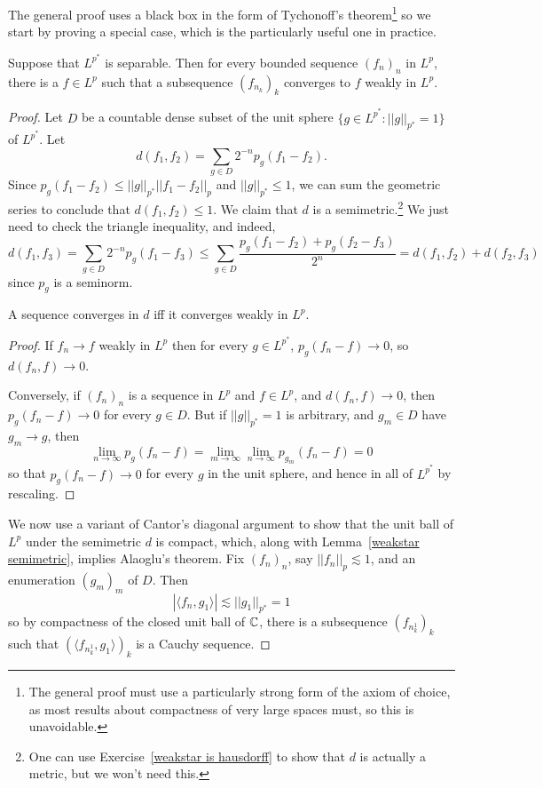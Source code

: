 The general proof uses a black box in the form of Tychonoff's theorem\footnote{The general proof must use a particularly strong form of the axiom of choice, as most results about compactness of very large spaces must, so this is unavoidable.} so we start by proving a special case, which is the particularly useful one in practice.

\begin{theorem}
Suppose that $L^{p^*}$ is separable. Then for every bounded sequence $(f_{n})_{n}$ in $L^p$, there is a $f \in L^p$ such that a subsequence $(f_{n_{k}})_{k}$ converges to $f$ weakly in $L^p$.
\end{theorem}
\begin{proof}
Let $D$ be a countable dense subset of the unit sphere $\{g \in L^{p^*}: ||g||_{p^*} = 1\}$ of $L^{p^*}$.
Let
\[d(f_1, f_2) = \sum_{g \in D} 2^{-n} p_g(f_1 - f_2).\]
Since $p_g(f_1 - f_2) \leq ||g||_{p^*} ||f_1 - f_2||_{p} $ and $||g||_{p^*} \leq 1$, we can sum the geometric series to conclude that $d(f_1, f_2) \leq 1$.
We claim that $d$ is a semimetric.\footnote{One can use Exercise~\ref{weakstar is hausdorff} to show that $d$ is actually a metric, but we won't need this.}
We just need to check the triangle inequality, and indeed,
\[d(f_1, f_3) = \sum_{g \in D} 2^{-n} p_g(f_1 - f_3) \leq \sum_{g \in D} \frac{p_g(f_1 - f_2) + p_g(f_2 - f_3)}{2^n} = d(f_1, f_2) + d(f_2, f_3)\]
since $p_g$ is a seminorm.

\begin{lemma}\label{weakstar semimetric}
A sequence converges in $d$ iff it converges weakly in $L^p$.
\end{lemma}
\begin{proof}
If $f_{n} \to f$ weakly in $L^p$ then for every $g \in L^{p^*}$, $p_g(f_{n} - f) \to 0$, so $d(f_{n}, f) \to 0$.

Conversely, if $(f_{n})_{n}$ is a sequence in $L^p$ and $f \in L^p$, and $d(f_{n}, f) \to 0$, then $p_g(f_{n} - f) \to 0$ for every $g \in D$.
But if $||g||_{p^*} = 1$ is arbitrary, and $g_{m} \in D$ have $g_{m} \to g$, then
\[\lim_{n \to \infty} p_g(f_{n} - f) = \lim_{m \to \infty} \lim_{n \to \infty} p_{g_{m}}(f_{n} - f) = 0\]
so that $p_g(f_{n} - f) \to 0$ for every $g$ in the unit sphere, and hence in all of $L^{p^*}$ by rescaling.
\end{proof}

We now use a variant of Cantor's diagonal argument to show that the unit ball of $L^p$ under the semimetric $d$ is compact, which, along with Lemma~\ref{weakstar semimetric}, implies Alaoglu's theorem.
Fix $(f_{n})_{n}$, say $||f_{n}||_{p}  \lesssim 1$, and an enumeration $(g_{m})_{m}$ of $D$.
Then
\[|\langle f_{n}, g_1\rangle| \lesssim ||g_1||_{p^*} = 1\]
so by compactness of the closed unit ball of $\mathbb{C}$, there is a subsequence $(f_{n_{k}^1})_{k}$ such that $(\langle f_{n_{k}^1}, g_1\rangle)_{k}$ is a Cauchy sequence.


\end{proof}
